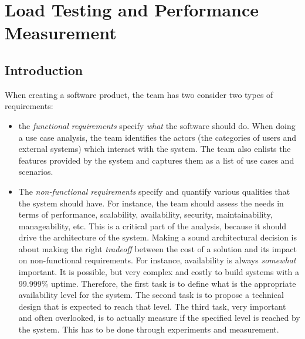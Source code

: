 \chapter{Load Testing and Performance Measurement}
\label{ch:performance-load-testing}

\section{Introduction}


When creating a software product, the team has two consider two types of requirements:

\begin{itemize}
\item the \emph{functional requirements} specify \emph{what} the software should do. When doing a use case analysis, the team identifies the actors (the categories of users and external systems) which interact with the system. The team also enlists the features provided by the system and captures them as a list of use cases and scenarios.
\item The \emph{non-functional requirements} specify and quantify various qualities that the system should have. For instance, the team should assess the needs in terms of performance, scalability, availability, security, maintainability, manageability, etc. This is a critical part of the analysis, because it should drive the architecture of the system. Making a sound architectural decision is about making the right \emph{tradeoff} between the cost of a solution and its impact on non-functional requirements. For instance, availability is always \emph{somewhat} important. It is possible, but very complex and costly to build systems with a 99.999\% uptime. Therefore, the first task is to define what is the appropriate availability level for the system. The second task is to propose a technical design that is expected to reach that level. The third task, very important and often overlooked, is to actually measure if the specified level is reached by the system. This has to be done through experiments and measurement.
\end{itemize}

